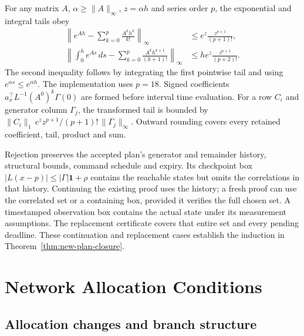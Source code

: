 For any matrix $A$, $\alpha\ge\|A\|_\infty$, $z=\alpha h$ and series order
$p$, the exponential and integral tails obey
\begin{equation}
 \begin{aligned}
 \left\|e^{Ah}-\sum_{k=0}^p\frac{A^kh^k}{k!}\right\|_\infty
       &\le e^z\frac{z^{p+1}}{(p+1)!},\\
 \left\|\int_0^h e^{As}\,ds-
          \sum_{k=0}^p\frac{A^kh^{k+1}}{(k+1)!}\right\|_\infty
       &\le he^z\frac{z^{p+1}}{(p+2)!}.
 \end{aligned}
 \label{eq:structure-matrix-tails}
\end{equation}
The second inequality follows by integrating the first pointwise tail and
using $e^{\alpha s}\le e^{\alpha h}$. The implementation uses $p=18$.
Signed coefficients $a_x^\top L^{-1}(A^0)^k\Gamma(0)$ are formed before
interval time evaluation. For a row $C_i$ and generator column $\Gamma_j$,
the transformed tail is bounded by
$\|C_i\|_1\,e^z z^{p+1}/(p+1)!\,\|\Gamma_j\|_\infty$.
Outward rounding covers every retained coefficient, tail, product and sum.

Rejection preserves the accepted plan's generator and remainder history,
structural bounds, command schedule and expiry. Its checkpoint box
$|L(x-p)|\le |\Gamma|\mathbf1+\rho$ contains the reachable states but
omits the correlations in that history. Continuing the existing proof uses
the history; a fresh proof can use the correlated set or a containing box,
provided it verifies the full chosen set. A timestamped observation box
contains the actual state under its measurement assumptions. The replacement
certificate covers that entire set and every pending deadline. These
continuation and replacement cases establish the induction in
Theorem~\ref{thm:new-plan-closure}.

\section{Network Allocation Conditions}
\label{app:network-assumptions}

\subsection{Allocation changes and branch structure}

